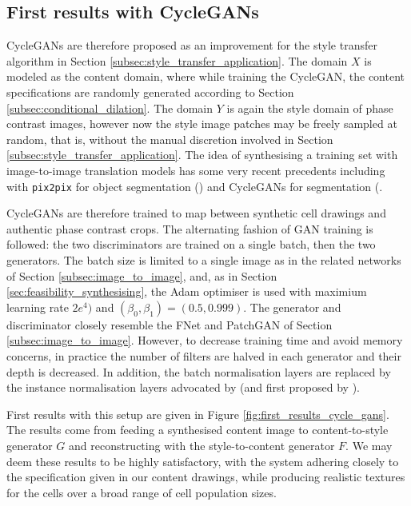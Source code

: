 \subsection{First results with CycleGANs}
\label{subsec:first_results_cyclegans}

CycleGANs are therefore proposed as an improvement for the style transfer algorithm in Section \ref{subsec:style_transfer_application}. The domain $X$ is modeled as the content domain, where while training the CycleGAN, the content specifications are randomly generated according to Section \ref{subsec:conditional_dilation}. The domain $Y$ is again the style domain of phase contrast images, however now the style image patches may be freely sampled at random, that is, without the manual discretion involved in Section \ref{subsec:style_transfer_application}. The idea of synthesising a training set with image-to-image translation models has some very recent precedents including with \texttt{pix2pix} for object segmentation (\cite{hollandi2019deep}) and CycleGANs for segmentation (\cite{fu2018three}.

CycleGANs are therefore trained to map between synthetic cell drawings and authentic phase contrast crops. The alternating fashion of GAN training is followed: the two discriminators are trained on a single batch, then the two generators. The batch size is limited to a single image as in the related networks of Section \ref{subsec:image_to_image}, and, as in Section \ref{sec:feasibility_synthesising}, the Adam optimiser is used with maximium learning rate $2e^{4})$ and $(\beta_0, \beta_1) = (0.5, 0.999)$. The generator and discriminator closely resemble the FNet and PatchGAN of Section \ref{subsec:image_to_image}. However, to decrease training time and avoid memory concerns, in practice the number of filters are halved in each generator and their depth is decreased. In addition, the batch normalisation layers are replaced by the instance normalisation layers advocated by \cite{isola2017image} (and first proposed by \cite{krizhevsky2012imagenet}).

First results with this setup are given in Figure \ref{fig:first_results_cycle_gans}. The results come from feeding a synthesised content image to content-to-style generator $G$ and reconstructing with the style-to-content generator $F$. We may deem these results to be highly satisfactory, with the system adhering closely to the specification given in our content drawings, while producing realistic textures for the cells over a broad range of cell population sizes.

